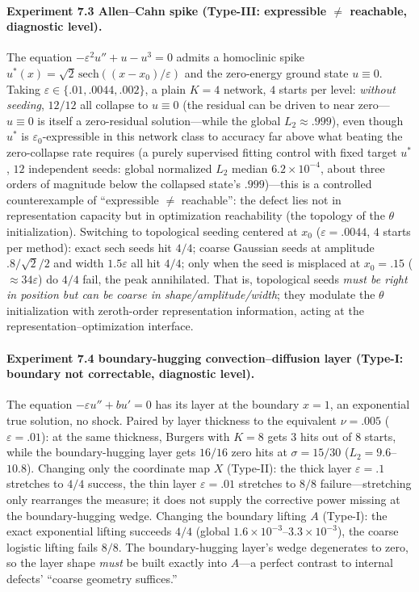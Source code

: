 \documentclass[11pt]{article}
\numberwithin{equation}{section}
\begin{document}
\paragraph{Experiment 7.3 Allen--Cahn spike (Type-III: expressible $\ne$ reachable, diagnostic level).} The equation $-\varepsilon^2u''+u-u^3=0$ admits a homoclinic spike $u^*(x)=\sqrt2\,\mathrm{sech}((x-x_0)/\varepsilon)$ and the zero-energy ground state $u\equiv0$. Taking $\varepsilon\in\{.01,.0044,.002\}$, a plain $K=4$ network, $4$ starts per level: \emph{without seeding}, $12/12$ all collapse to $u\equiv0$ (the residual can be driven to near zero---$u\equiv0$ is itself a zero-residual solution---while the global $L_2\approx.999$), even though $u^*$ is $\varepsilon_0$-expressible in this network class to accuracy far above what beating the zero-collapse rate requires (a purely supervised fitting control with fixed target $u^*$, $12$ independent seeds: global normalized $L_2$ median $6.2\times10^{-4}$, about three orders of magnitude below the collapsed state's $.999$)---this is a controlled counterexample of ``expressible $\ne$ reachable'': the defect lies not in representation capacity but in optimization reachability (the topology of the $\theta$ initialization). Switching to topological seeding centered at $x_0$ ($\varepsilon=.0044$, $4$ starts per method): exact sech seeds hit $4/4$; coarse Gaussian seeds at amplitude $.8/\sqrt2/2$ and width $1.5\varepsilon$ all hit $4/4$; only when the seed is misplaced at $x_0=.15$ ($\approx34\varepsilon$) do $4/4$ fail, the peak annihilated. That is, topological seeds \emph{must be right in position but can be coarse in shape/amplitude/width}; they modulate the $\theta$ initialization with zeroth-order representation information, acting at the representation--optimization interface.

\paragraph{Experiment 7.4 boundary-hugging convection--diffusion layer (Type-I: boundary not correctable, diagnostic level).} The equation $-\varepsilon u''+bu'=0$ has its layer at the boundary $x=1$, an exponential true solution, no shock. Paired by layer thickness to the equivalent $\nu=.005$ ($\varepsilon=.01$): at the same thickness, Burgers with $K=8$ gets $3$ hits out of $8$ starts, while the boundary-hugging layer gets $16/16$ zero hits at $\sigma=15/30$ ($L_2=9.6$--$10.8$). Changing only the coordinate map $X$ (Type-II): the thick layer $\varepsilon=.1$ stretches to $4/4$ success, the thin layer $\varepsilon=.01$ stretches to $8/8$ failure---stretching only rearranges the measure; it does not supply the corrective power missing at the boundary-hugging wedge. Changing the boundary lifting $A$ (Type-I): the exact exponential lifting succeeds $4/4$ (global $1.6\times10^{-3}$--$3.3\times10^{-3}$), the coarse logistic lifting fails $8/8$. The boundary-hugging layer's wedge degenerates to zero, so the layer shape \emph{must} be built exactly into $A$---a perfect contrast to internal defects' ``coarse geometry suffices.''
\end{document}
